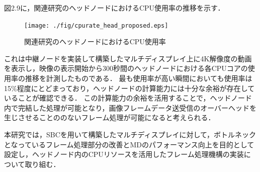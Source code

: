 図2.9に，関連研究のヘッドノードにおけるCPU使用率の推移を示す．

\begin{figure}[H]
  \hspace*{\fill}
  \texttt{[image: ./fig/cpurate\_head\_proposed.eps]}
  \hspace*{\fill}
  \caption{関連研究のヘッドノードにおけるCPU使用率}
 \end{figure}

これは中継ノードを実装して構築したマルチディスプレイ上に4K解像度の動画を表示し，映像の表示開始から300秒間のヘッドノードにおける各CPUコアの使用率の推移を計測したものである．
最も使用率が高い瞬間においても使用率は15\%程度にとどまっており，ヘッドノードの計算能力には十分な余裕が存在していることが確認できる．
この計算能力の余裕を活用することで，ヘッドノード内で完結した処理が可能となり，画像フレームデータ送受信のオーバーヘッドを生じさせることののないフレーム処理が可能になると考えられる．

本研究では，SBCを用いて構築したマルチディスプレイに対して，ボトルネックとなっているフレーム処理部分の改善とMDのパフォーマンス向上を目的として設定し，ヘッドノード内のCPUリソースを活用したフレーム処理機構の実装について取り組む．


